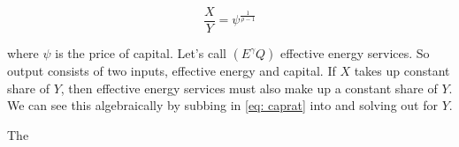 \documentclass[12pt,english]{article}
\theoremstyle{definition}
\theoremstyle{plain}
\theoremstyle{plain}
\theoremstyle{remark}
\theoremstyle{definition}
\theoremstyle{plain}
\theoremstyle{plain}
\theoremstyle{remark}
\theoremstyle{plain}
\theoremstyle{remark}
\theoremstyle{plain}
\theoremstyle{plain}
\theoremstyle{plain}
\begin{document}
\begin{equation}\label{eq: caprat}
\frac{X}{Y} = \psi^{\frac{1}{\rho-1}}
\end{equation}

where $\psi$ is the price of capital. Let's call $\left(E^{\gamma}Q\right)$ effective energy services. So output consists of two inputs, effective energy and capital. If $X$ takes up constant share of $Y$, then effective energy services must also make up a constant share of $Y$. We can see this algebraically by subbing in \ref{eq: caprat} into \label{eq: product} and solving out for $Y$. 

The 
\end{document}
